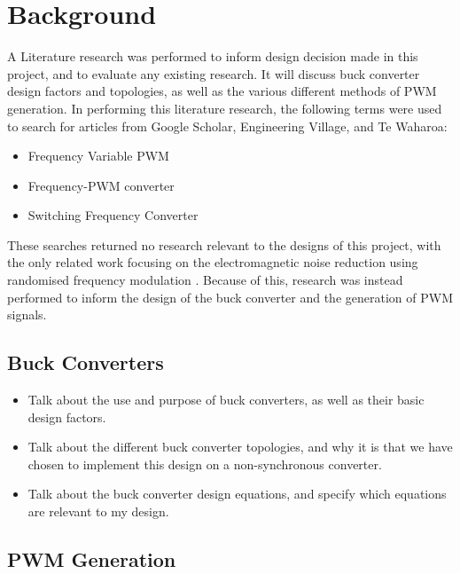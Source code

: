 \chapter{Background}\label{C:background}

A Literature research was performed to inform design decision made in this project, and to evaluate any existing research. It will discuss buck converter design factors and topologies, as well as the various different methods of PWM generation. In performing this literature research, the following terms were used to search for articles from Google Scholar, Engineering Village, and Te Waharoa:

\begin{itemize}
    \item Frequency Variable PWM
    \item Frequency-PWM converter
    \item Switching Frequency Converter
\end{itemize}

These searches returned no research relevant to the designs of this project, with the only related work focusing on the electromagnetic noise reduction using randomised frequency modulation \cite{Roman2001,Familiant2016}. Because of this, research was instead performed to inform the design of the buck converter and the generation of PWM signals.


\section{Buck Converters}

\begin{itemize}

    \item 
    Talk about the use and purpose of buck converters, as well as their basic design factors.

    \item 
    Talk about the different buck converter topologies, and why it is that we have chosen to implement this design on a non-synchronous converter. 

    \item 
    Talk about the buck converter design equations, and specify which equations are relevant to my design.

\end{itemize}



\section{PWM Generation}

